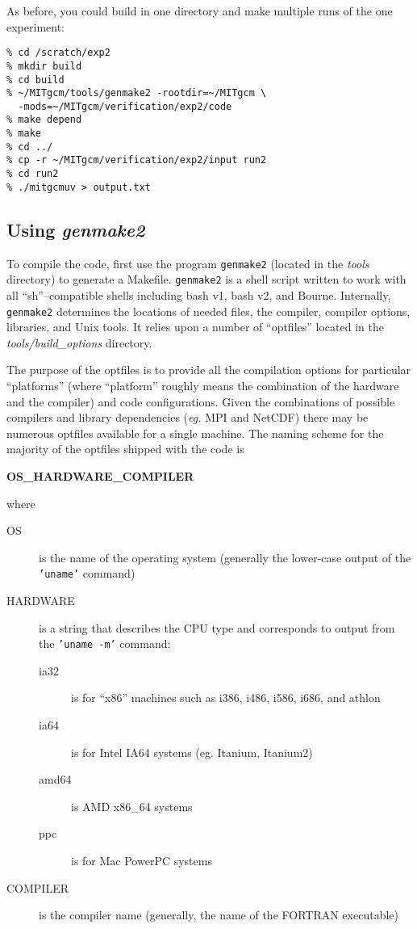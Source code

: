 As before, you could build in one directory and make multiple runs of
the one experiment:
\begin{verbatim}
% cd /scratch/exp2
% mkdir build
% cd build
% ~/MITgcm/tools/genmake2 -rootdir=~/MITgcm \
  -mods=~/MITgcm/verification/exp2/code
% make depend
% make
% cd ../
% cp -r ~/MITgcm/verification/exp2/input run2
% cd run2
% ./mitgcmuv > output.txt
\end{verbatim}



\subsection{Using \textit{genmake2}}
\label{sect:genmake}

To compile the code, first use the program \texttt{genmake2} (located
in the \textit{tools} directory) to generate a Makefile.
\texttt{genmake2} is a shell script written to work with all
``sh''--compatible shells including bash v1, bash v2, and Bourne.
Internally, \texttt{genmake2} determines the locations of needed
files, the compiler, compiler options, libraries, and Unix tools.  It
relies upon a number of ``optfiles'' located in the {\em
  tools/build\_options} directory.

The purpose of the optfiles is to provide all the compilation options
for particular ``platforms'' (where ``platform'' roughly means the
combination of the hardware and the compiler) and code configurations.
Given the combinations of possible compilers and library dependencies
({\it eg.}  MPI and NetCDF) there may be numerous optfiles available
for a single machine.  The naming scheme for the majority of the
optfiles shipped with the code is
\begin{center}
  {\bf OS\_HARDWARE\_COMPILER }
\end{center}
where
\begin{description}
\item[OS] is the name of the operating system (generally the
  lower-case output of the {\tt 'uname'} command)
\item[HARDWARE] is a string that describes the CPU type and
  corresponds to output from the  {\tt 'uname -m'} command:
  \begin{description}
  \item[ia32] is for ``x86'' machines such as i386, i486, i586, i686,
    and athlon
  \item[ia64] is for Intel IA64 systems (eg. Itanium, Itanium2)
  \item[amd64] is AMD x86\_64 systems
  \item[ppc] is for Mac PowerPC systems
  \end{description}
\item[COMPILER] is the compiler name (generally, the name of the
  FORTRAN executable)
\end{description}

